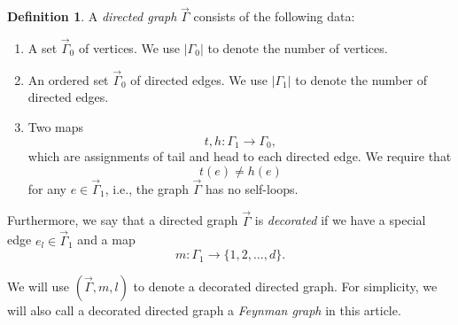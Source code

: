 \documentclass[11pt]{amsart}
\theoremstyle{definition}
\newtheorem{defn}[thm]{Definition}
\theoremstyle{remark}
\numberwithin{equation}{section}
\begin{document}
%
\begin{defn}
  A \textit{directed graph} $\vec{\Gamma}$ consists of the following data:
    \begin{enumerate}
        \item A set $\vec{\Gamma}_{0}$ of vertices. We use $|\Gamma_{0}|$ to denote the number of vertices.
        \item An ordered set $\vec{\Gamma}_{0}$ of directed edges. We use $|\Gamma_{1}|$ to denote the number of directed edges.
        \item Two maps
        $$
        t,h:\Gamma_{1}\rightarrow\Gamma_{0},
        $$
        which are assignments of tail and head to each directed edge. We require that
        $$
        t(e)\neq h(e)
        $$
        for any $e\in\vec{\Gamma}_{1}$, i.e., the graph $\vec{\Gamma}$ has no self-loops.
    \end{enumerate}
    Furthermore, we say that a directed graph $\vec{\Gamma}$ is \textit{decorated} if we have a special edge $e_{l}\in \vec{\Gamma}_{1}$ and a map
    $$
    m \colon \Gamma_{1}\rightarrow\{1,2,\dots,d\}.
    $$
\end{defn}

We will use $(\vec{\Gamma},m,l)$ to denote a decorated directed graph. For simplicity, we will also call a decorated
directed graph a \textit{Feynman graph} in this article.
\end{document}
